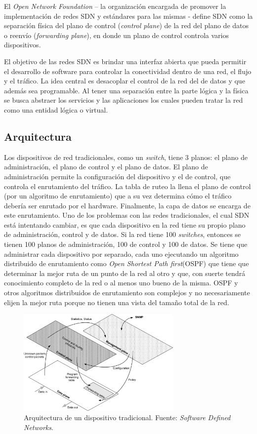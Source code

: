 \documentclass[10pt,journal,compsoc]{IEEEtran}
\begin{document}
El \textit{Open Network Foundation} -- la organización encargada de promover la implementación de redes SDN y estándares para las mismas - define SDN como la separación física del plano de control (\emph{control plane}) de la red del plano de datos o reenvío (\emph{forwarding plane}), en donde un plano de control controla varios dispositivos\cite{onf}. 

El objetivo de las redes SDN es brindar una interfaz abierta que pueda permitir el desarrollo de software para controlar la conectividad dentro de una red, el flujo y el tráfico.
La idea central es desacoplar el control de la red del de datos y que además sea programable. Al tener una separación entre la parte lógica y la física se busca abstraer los servicios y las aplicaciones los cuales pueden tratar la red como una entidad lógica o virtual. 


\subsection{Arquitectura}
Los dispositivos de red tradicionales, como un \emph{switch}, tiene 3 planos: el plano de administración, el plano de control y el plano de datos. El plano de administración permite la configuración del dispositivo y el de control, que controla el enrutamiento del tráfico. La tabla de ruteo la llena el plano de control (por un algoritmo de enrutamiento) que a su vez determina cómo el tráfico debería ser enrutado por el hardware. Finalmente, la capa de datos se encarga de este enrutamiento. Uno de los problemas con las redes tradicionales, el cual SDN está intentando cambiar, es que cada dispositivo en la red tiene su propio plano de administración, control y de datos. Si la red tiene 100 \emph{switches}, entonces se tienen 100 planos de administración, 100 de control y 100 de datos. Se tiene que administrar cada dispositivo por separado, cada uno ejecutando un algoritmo distribuido de enrutamiento como \emph{Open Shortest Path first}(OSPF) que tiene que determinar la mejor ruta de un punto de la red al otro y que, con suerte tendrá conocimiento completo de la red o al menos uno bueno de la misma. OSPF y otros algoritmos distribuidos de enrutamiento son complejos y no necesariamente elijen la mejor ruta porque no tienen una vista del tamaño total de la red. 

\begin{figure}[h]
    \centering
    \includegraphics[width=8cm]{traditional-3-tier-device}
    \caption{Arquitectura de un dispositivo tradicional. Fuente: \emph{Software Defined Networks}\cite{goransson}.}
    \label{fig:tradicitional-architecture}
\end{figure}
\end{document}
